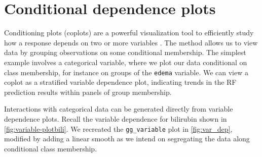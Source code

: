 \documentclass[article, nojss]{jss}
\begin{document}
\section{Conditional dependence
plots}\label{conditional-dependence-plots}

Conditioning plots (coplots) \citep{chambers:1992,cleveland:1993} are a
powerful visualization tool to efficiently study how a response depends
on two or more variables \citep{cleveland:1993}. The method allows us to
view data by grouping observations on some conditional membership. The
simplest example involves a categorical variable, where we plot our data
conditional on class membership, for instance on groups of the
\texttt{edema} variable. We can view a coplot as a stratified variable
dependence plot, indicating trends in the RF prediction results within
panels of group membership.

Interactions with categorical data can be generated directly from
variable dependence plots. Recall the variable dependence for bilirubin
shown in \autoref{fig:variable-plotbili}. We recreated the
\texttt{gg\_variable} plot in \autoref{fig:var_dep}, modified by adding
a linear smooth as we intend on segregating the data along conditional
class membership.
\end{document}
